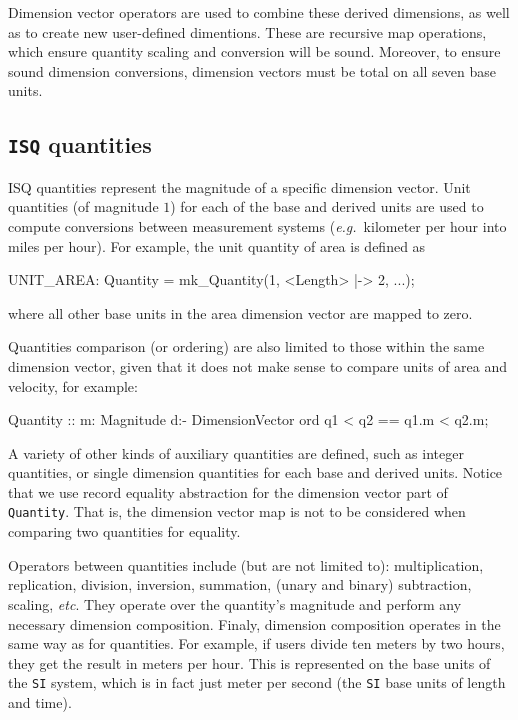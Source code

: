 \documentclass[runningheads,a4paper]{llncs}
\begin{document}
Dimension vector operators are used to combine these derived dimensions, as well as to create new user-defined dimentions. These are recursive map operations, which ensure quantity scaling and conversion will be sound. Moreover, to ensure sound dimension conversions, dimension vectors must be total on all seven base units.      

\subsection*{\texttt{ISQ} quantities}

ISQ quantities represent the magnitude of a specific dimension vector. Unit quantities (of magnitude \(1\)) for each of the base and derived units are used to compute conversions between measurement systems (\textit{e.g.}~kilometer per hour into miles per hour). For example, the unit quantity of area is defined as
%
\begin{vdmsl}[frame=none,basicstyle=\ttfamily\scriptsize]
    UNIT_AREA: Quantity = mk_Quantity(1, {<Length> |-> 2, ...});
\end{vdmsl}
%
\noindent where all other base units in the area dimension vector are mapped to zero. 

Quantities comparison (or ordering) are also limited to those within the same dimension vector, given that it does not make sense to compare units of area and velocity, for example:
%
\begin{vdmsl}[frame=none,basicstyle=\ttfamily\scriptsize]
    Quantity :: m: Magnitude d:- DimensionVector 
    ord q1 < q2 == q1.m < q2.m; 
\end{vdmsl}
%  
\noindent A variety of other kinds of auxiliary quantities are defined, such as integer quantities, or single dimension quantities for each base and derived units. Notice that we use record equality abstraction for the dimension vector part of \verb'Quantity'. That is, the dimension vector map is not to be considered when comparing two quantities for equality.   

Operators between quantities include (but are not limited to): multiplication, replication, division, inversion, summation, (unary and binary) subtraction, scaling, \textit{etc}. They operate over the quantity's magnitude and perform any necessary dimension composition. Finaly, dimension composition operates in the same way as for quantities. For example, if users divide ten meters by two hours, they get the result in meters per hour. This is represented on the base units of the \texttt{SI} system, which is in fact just meter per second (the \texttt{SI} base units of length and time).    
\end{document}
